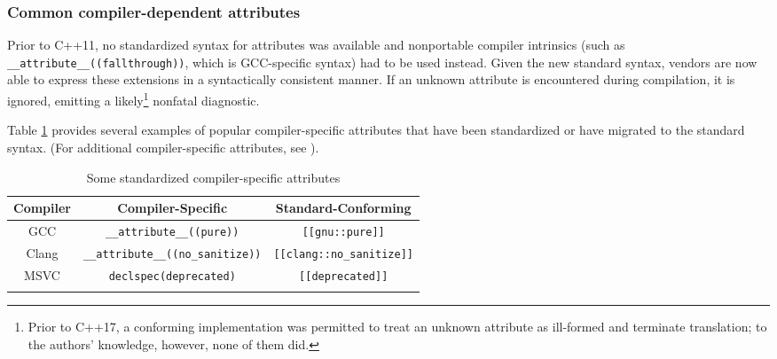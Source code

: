 \subsubsection[Common compiler-dependent attributes]{Common compiler-dependent attributes}\label{common-compiler-dependent-attributes}

Prior to C++11, no standardized syntax for attributes was available and nonportable compiler intrinsics
(such as \mbox{\lstinline!__attribute__((fallthrough))!}, which is
GCC-specific syntax) had to be used instead. Given the new standard
syntax, vendors are now able to express these extensions in a syntactically consistent manner. If an unknown attribute is
encountered during compilation, it is ignored, emitting a likely{\cprotect\footnote{Prior to C++17, a conforming implementation was
permitted to treat an unknown attribute as ill-formed and terminate
  translation; to the authors' knowledge, however, none of them did.}} nonfatal
diagnostic.

Table \ref{attribute-table1} provides several examples of popular compiler-specific attributes
that have been standardized or have migrated to the standard syntax. (For
additional compiler-specific attributes, see ).

\begin{table}[h!] 
\begin{center}
\begin{threeparttable}
\caption{Some standardized compiler-specific attributes}\label{attribute-table1}\vspace{1.5ex} 
{\small \begin{tabular}{c|c|c}\thickhline 
\rowcolor[gray]{.9}   {\sffamily\bfseries Compiler} & {\sffamily\bfseries Compiler-Specific} &
{\sffamily\bfseries Standard-Conforming} \\ \hline 
GCC &\lstinline!__attribute__((pure))! & \lstinline![[gnu::pure]]! \\ \hline
Clang & \lstinline!__attribute__((no_sanitize))! &\lstinline![[clang::no_sanitize]]! \\ \hline 
MSVC & \lstinline!declspec(deprecated)! & \lstinline![[deprecated]]! \\ \thickhline
\end{tabular}
}
\end{threeparttable} 
\end{center}
\end{table}

